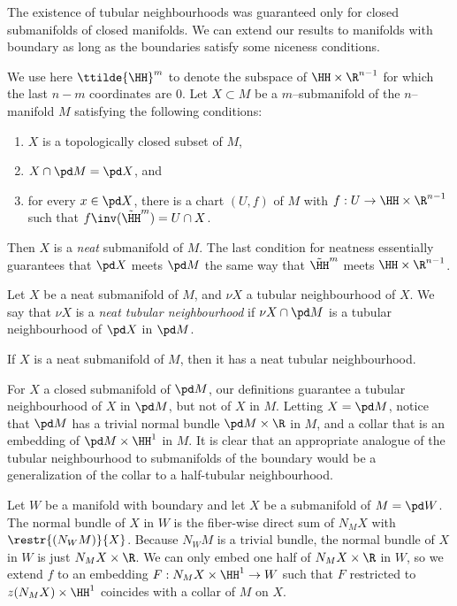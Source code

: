 
The existence of tubular neighbourhoods was guaranteed only for closed submanifolds of closed manifolds.
We can extend our results to manifolds with boundary as long as the boundaries satisfy some niceness conditions.

\begin{defn}
	We use here $\ttilde{\HH}^m$ to denote the subspace of $\HH\times\R^{n-1}$ for which the last $n-m$ coordinates are $0$. 
	Let $X\subset M$ be a $m$--submanifold of the $n$--manifold $M$ satisfying the following conditions:
	\begin{enumerate}
		\item $X$ is a topologically closed subset of $M$,
		\item $X\cap \pd M=\pd X$, and
		\item for every $x\in\pd X$, there is a chart $(U,f)$ of $M$ with $f:U\to\HH\times\R^{n-1}$ such that $f\inv(\tilde{\HH}^m)=U\cap X$.
	\end{enumerate}
	Then $X$ is a \emph{neat} submanifold of $M$.
	The last condition for neatness essentially guarantees that $\pd X$ meets $\pd M$ the same way that $\tilde{\HH}^m$ meets $\HH\times\R^{n-1}$.
\end{defn}

\begin{defn}
	Let $X$ be a neat submanifold of $M$, and $\nu X$ a tubular neighbourhood of $X$.
	We say that $\nu X$ is a \emph{neat tubular neighbourhood} if $\nu X\cap \pd M$ is a tubular neighbourhood of $\pd X$ in $\pd M$.	
\end{defn}

\begin{theorem}
	If $X$ is a neat submanifold of $M$, then it has a neat tubular neighbourhood.
\end{theorem}

For $X$ a closed submanifold of $\pd M$, our definitions guarantee a tubular neighbourhood of $X$ in $\pd M$, but not of $X$ in $M$.
Letting $X=\pd M$, notice that $\pd M$ has a trivial normal bundle $\pd M\times \R$ in $M$, and a collar that is an embedding of $\pd M\times\HH^1$ in $M$.
It is clear that an appropriate analogue of the tubular neighbourhood to submanifolds of the boundary would be a generalization of the collar to a half-tubular neighbourhood.

\begin{defn}
	\label{def:halfneighbourhood}
	Let $W$ be a manifold with boundary and let $X$ be a submanifold of $M=\pd W$.
	The normal bundle of $X$ in $W$ is the fiber-wise direct sum of $N_M X$ with $\restr{(N_W M)}{X}$.
	Because $N_W M$ is a trivial bundle, the normal bundle of $X$ in $W$ is just $N_M X\times \R$.
	We can only embed one half of $N_M X\times \R$ in $W$, so we extend $f$ to an embedding $F:N_M X\times \HH^1\to W$ such that $F$ restricted to $z(N_M X)\times\HH^1$ coincides with a collar of $M$ on $X$.
\end{defn}

